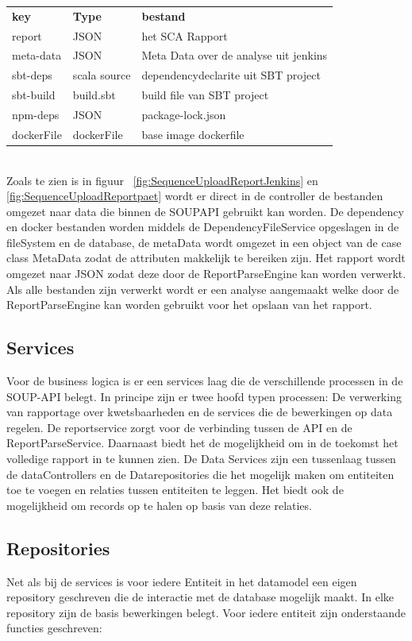 \begin{tabular}{lll}
    \textbf{key} & \textbf{Type} & \textbf{bestand} \\
    report & JSON & het SCA Rapport \\
    meta-data & JSON & Meta Data over de analyse uit jenkins \\
    sbt-deps & scala source & dependencydeclarite uit SBT project \\
    sbt-build & build.sbt  & build file van SBT project\\
    npm-deps & JSON & package-lock.json \\
    dockerFile & dockerFile & base image dockerfile
\end{tabular} \\
Zoals te zien is in figuur ~\ref{fig:SequenceUploadReportJenkins} en \ref{fig:SequenceUploadReportpaet} wordt er direct in de controller de bestanden omgezet naar data die binnen de SOUPAPI gebruikt kan worden. De dependency en docker bestanden worden middels de DependencyFileService opgeslagen in de fileSystem en de database, de metaData wordt omgezet in een object van de case class MetaData zodat de attributen makkelijk te bereiken zijn. Het rapport wordt omgezet naar JSON zodat deze door de ReportParseEngine kan worden verwerkt. Als alle bestanden zijn verwerkt wordt er een analyse aangemaakt welke door de ReportParseEngine kan worden gebruikt voor het opslaan van het rapport.

\subsection{Services}\label{subsec:Services}
Voor de business logica is er een services laag die de verschillende processen in de SOUP-API belegt. In principe zijn er twee hoofd typen processen: De verwerking van rapportage over kwetsbaarheden en de services die de bewerkingen op data regelen.
De reportservice zorgt voor de verbinding tussen de API en de ReportParseService. Daarnaast biedt het de mogelijkheid om in de toekomst het volledige rapport in te kunnen zien.
De Data Services zijn een tussenlaag tussen de dataControllers en de Datarepositories die het mogelijk maken om entiteiten toe te voegen en relaties tussen entiteiten te leggen. Het biedt ook de mogelijkheid om records op te halen op basis van deze relaties.

\subsection{Repositories}\label{subsec:repositories}
Net als bij de services is voor iedere Entiteit in het datamodel een eigen repository geschreven die de interactie met de database mogelijk maakt. In elke repository zijn de basis bewerkingen belegt. Voor iedere entiteit zijn onderstaande functies geschreven:


